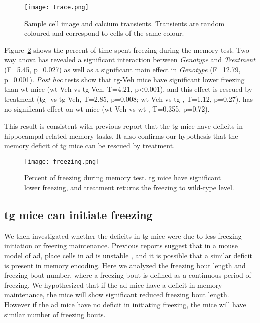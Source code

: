 \begin{figure}[h]
    \texttt{[image: trace.png]}
    \caption[Sample cell image and calcium transients.]{Sample cell image and calcium transients. Transients are random coloured and correspond to cells of the same colour. \label{f.ad.trace}}
\end{figure}


Figure~\ref{f.ad.freezing} shows the percent of time spent freezing during the memory test. Two-way \gls{anova} has revealed a significant interaction between \textit{Genotype} and \textit{Treatment} (F=5.45, p=0.027) as well as a significant main effect in \textit{Genotype} (F=12.79, p=0.001).  \textit{Post hoc} tests show that \gls{tg}-Veh mice have significant lower freezing than \gls{wt} mice (\gls{wt}-Veh vs \gls{tg}-Veh, T=4.21, p<0.001), and this effect is rescued by \tglu{} treatment (\gls{tg}-\glu{} vs \gls{tg}-Veh, T=2.85, p=0.008; \gls{wt}-Veh vs \gls{tg}-\glu, T=1.12, p=0.27). \tglu{} has no significant effect on \gls{wt} mice (\gls{wt}-Veh vs \gls{wt}-\glu, T=0.355, p=0.72). 

This result is consistent with previous report \citep{palmer11, zhou16} that the \gls{tg} mice have deficits in hippocampal-related memory tasks. It also confirms our hypothesis that the memory deficit of \gls{tg} mice can be rescued by \tglu{} treatment. 

\begin{figure}[h]
    \texttt{[image: freezing.png]}
    \caption[Percent of freezing during memory test.]{Percent of freezing during memory test. \Gls{tg} mice have significant lower freezing, and \tglu{} treatment returns the freezing to wild-type level. \label{f.ad.freezing}}
\end{figure}

\subsection{\Gls{tg} mice can initiate freezing}
We then investigated whether the deficits in \gls{tg} mice were due to less freezing initiation or freezing maintenance. Previous reports suggest that in a mouse model of \gls{ad}, place cells in \gls{ad} is unstable \citep{cheng13}, and it is possible that a similar deficit is present in memory encoding. Here we analyzed the freezing bout length and freezing bout number, where a freezing bout is defined as a continuous period of freezing. We hypothesized that if the \gls{ad} mice have a deficit in memory maintenance, the mice will show significant reduced freezing bout length. However if the \gls{ad} mice have no deficit in initiating freezing, the mice will have similar number of freezing bouts.

